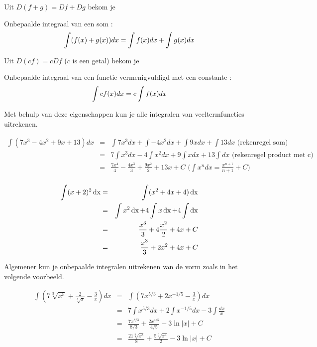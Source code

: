 Uit $D(f+g)=Df+Dg$ bekom je

\begin{eigenschap} Onbepaalde integraal van een som : \\
\[\int (f(x)+g(x))dx = \int f(x)dx + \int g(x)dx \hfill\]
\end{eigenschap}

Uit $D(cf)=cDf$ ($c$ is een getal) bekom je

\begin{eigenschap} Onbepaalde integraal van een functie vermenigvuldigd met een constante :\\
\[\int cf(x)dx = c \int f(x)dx \hfill\]
\end{eigenschap}

Met behulp van deze eigenschappen kun je alle integralen van veeltermfuncties uitrekenen.

\begin{voorbeeld}
	\begin{eqnarray*}
	\int (7x^3-4x^2+9x+13)dx
	&=&\int 7x^3dx+\int -4x^2dx+\int 9xdx + \int 13dx \text{ (rekenregel som)}\\
	&=& 7\int x^3dx -4 \int x^2dx+9\int xdx + 13 \int dx \text{ (rekenregel product met c)}\\
	&=& \frac{7x^4}{4} -\frac{4x^3}{3} + \frac{9x^2}{2} +13 x+C \text{ ($\int x^n dx=\frac{x^{n+1}}{n+1}+C$)}\\
	\end{eqnarray*}
\end{voorbeeld}

\begin{voorbeeld} 
	\begin{eqnarray*}
	\int (x+2)^2 \operatorname{dx} &=& \int (x^2+4x+4)\operatorname{dx} \\
	&=& \int x^2 \operatorname{dx} + 4 \int x\operatorname{dx} +4 \int \operatorname{dx} \\
	&=& \frac{x^3}{3} + 4 \frac{x^2}{2} + 4x + C\\
	&=& \frac{x^3}{3} + 2 x^2 + 4x + C
	\end{eqnarray*}
\end{voorbeeld}

Algemener kun je onbepaalde integralen uitrekenen van de vorm zoals in het volgende voorbeeld.

\begin{voorbeeld}
	\begin{eqnarray*}
	\int (7\sqrt[3]{x^5}+\frac{2}{\sqrt[5]{x}}-\frac{3}{x})dx
	&=&\int (7x^{5/3}+2x^{-1/5}-\frac{3}{x})dx\\
	&=&7\int x^{5/3}dx+2\int x^{-1/5}dx-3\int \frac{dx}{x}\\
	&=& \frac{7x^{8/3}}{8/3}+\frac{2x^{4/5}}{4/5}-3\ln \vert x \vert +C\\
	&=& \frac{21\sqrt[3]{x^8}}{8}+\frac{5\sqrt[5]{x^4}}{2}-3 \ln \vert x \vert +C\\
	\end{eqnarray*}
\end{voorbeeld}

